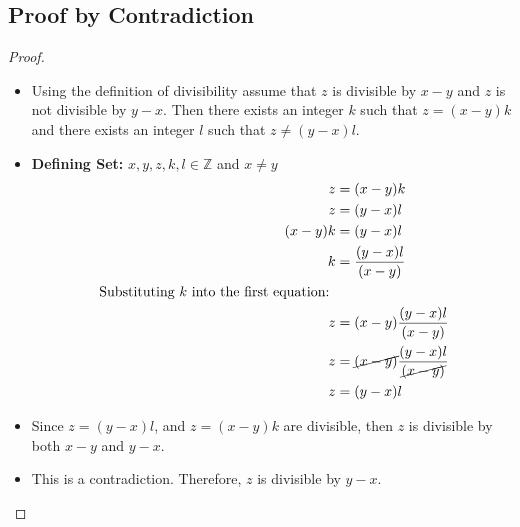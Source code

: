 \documentclass{article}
\begin{document}
\subsection*{Proof by Contradiction}
\begin{proof}
    
    \begin{itemize}
        \item[]Using the definition of divisibility assume that $z$ is divisible by $x - y$ and $z$ is not divisible by $y - x$. Then there exists an integer $k$ such that $z = (x - y)k$ and there exists an integer $l$ such that $z \neq (y - x)l$.
        \item[] \textbf{Defining Set: }$x, y, z, k, l \in \mathbb{Z}$ and $x \neq y$
        \begin{align*}
        z &= (x - y)k \\
        z &= (y - x)l \\
        (x - y)k &= (y - x)l \\
        k &= \frac{(y - x)l}{(x - y)} \\
        \text{ Substituting } k \text{ into the first equation: } \\
        z &= (x - y)\frac{(y - x)l}{(x - y)} \\
        z &= \cancel{(x - y)}\frac{(y - x)l}{\cancel{(x - y)}} \\ 
        z &= (y - x)l
    \end{align*}
    \item[] Since $z = (y - x)l$, and $z = (x - y)k$ are divisible, then $z$ is divisible by both $x - y$ and $y - x$.
    \item[] This is a contradiction. Therefore, $z$ is divisible by $y - x$.
    \end{itemize}
\end{proof}
\end{document}
